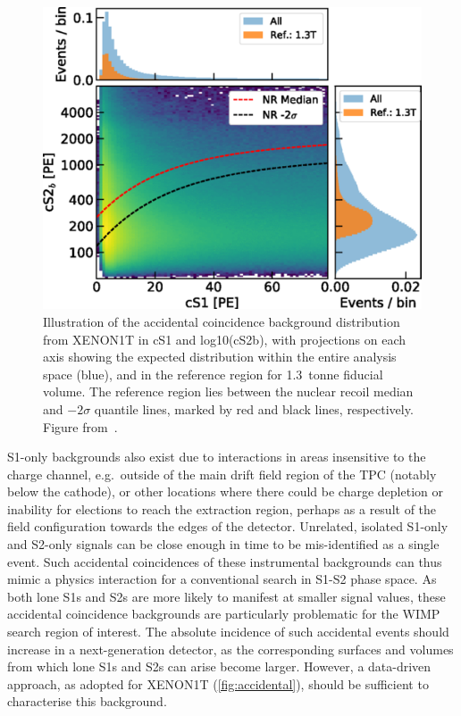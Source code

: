\begin{figure}[!htbp]
\begin{center}
\includegraphics[width=0.95\columnwidth]{fig_x1t_accidentals.png}
\caption{Illustration of the accidental coincidence background distribution from XENON1T in cS1 and log10(cS2b), with projections on each axis showing the expected distribution within the entire analysis space (blue), and in the reference region for 1.3~tonne fiducial volume. The reference region lies between the nuclear recoil median and $-2\sigma$ quantile lines, marked by red and black lines, respectively. Figure from~\cite{Aprile:2019dme}.}\label{fig:accidental}
\end{center}
\end{figure}

S1-only backgrounds also exist due to interactions in areas insensitive to the charge channel, e.g.~outside of the main drift field region of the TPC (notably below the cathode), or other locations where there could be charge depletion or inability for elections to reach the extraction region, perhaps as a result of the field configuration towards the edges of the detector. Unrelated, isolated S1-only and S2-only signals can be close enough in time to be mis-identified as a single event. Such accidental coincidences of these instrumental backgrounds can thus mimic a physics interaction for a conventional search in S1-S2 phase space. As both lone S1s and S2s are more likely to manifest at smaller signal values, these accidental coincidence backgrounds are particularly problematic for the WIMP search region of interest. The absolute incidence of such accidental events should increase in a next-generation detector, as the corresponding surfaces and volumes from which lone S1s and S2s can arise become larger. However, a data-driven approach, as adopted for XENON1T (\autoref{fig:accidental}), should be sufficient to characterise this background. 

